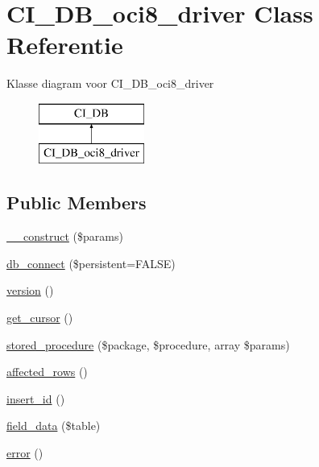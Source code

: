 \hypertarget{class_c_i___d_b__oci8__driver}{}\section{C\+I\+\_\+\+D\+B\+\_\+oci8\+\_\+driver Class Referentie}
\label{class_c_i___d_b__oci8__driver}
Klasse diagram voor C\+I\+\_\+\+D\+B\+\_\+oci8\+\_\+driver\begin{figure}[H]
\begin{center}
\leavevmode
\includegraphics[height=2.000000cm]{class_c_i___d_b__oci8__driver}
\end{center}
\end{figure}
\subsection*{Public Members}
\begin{DoxyCompactItemize}
\item 
\mbox{\hyperlink{class_c_i___d_b__oci8__driver_a9162320adff1a1a4afd7f2372f753a3e}{\+\_\+\+\_\+construct}} (\$params)
\item 
\mbox{\hyperlink{class_c_i___d_b__oci8__driver_a52bf595e79e96cc0a7c907a9b45aeb4d}{db\+\_\+connect}} (\$persistent=F\+A\+L\+SE)
\item 
\mbox{\hyperlink{class_c_i___d_b__oci8__driver_a6080dae0886626b9a4cedb29240708b1}{version}} ()
\item 
\mbox{\hyperlink{class_c_i___d_b__oci8__driver_aaf8b241dc9ed2d812e965dc882ed9ea3}{get\+\_\+cursor}} ()
\item 
\mbox{\hyperlink{class_c_i___d_b__oci8__driver_adb2007e6a64069385b285c77480d87b7}{stored\+\_\+procedure}} (\$package, \$procedure, array \$params)
\item 
\mbox{\hyperlink{class_c_i___d_b__oci8__driver_a77248aaad33eb132c04cc4aa3f4bc8cb}{affected\+\_\+rows}} ()
\item 
\mbox{\hyperlink{class_c_i___d_b__oci8__driver_a933f2cde8dc7f87875e257d0a4902e99}{insert\+\_\+id}} ()
\item 
\mbox{\hyperlink{class_c_i___d_b__oci8__driver_a90355121e1ed009e0efdbd544ab56efa}{field\+\_\+data}} (\$table)
\item 
\mbox{\hyperlink{class_c_i___d_b__oci8__driver_a43b8d30b879d4f09ceb059b02af2bc02}{error}} ()
\end{DoxyCompactItemize}
